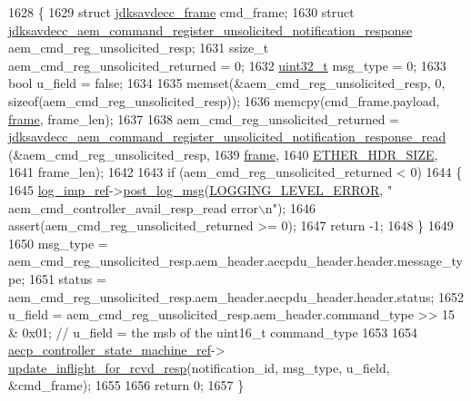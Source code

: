 \begin{DoxyCode}
1628 \{
1629     \textcolor{keyword}{struct }\hyperlink{structjdksavdecc__frame}{jdksavdecc\_frame} cmd\_frame;
1630     \textcolor{keyword}{struct }\hyperlink{structjdksavdecc__aem__command__register__unsolicited__notification__response}{jdksavdecc\_aem\_command\_register\_unsolicited\_notification\_response}
       aem\_cmd\_reg\_unsolicited\_resp;
1631     ssize\_t aem\_cmd\_reg\_unsolicited\_returned = 0;
1632     \hyperlink{parse_8c_a6eb1e68cc391dd753bc8ce896dbb8315}{uint32\_t} msg\_type = 0;
1633     \textcolor{keywordtype}{bool} u\_field = \textcolor{keyword}{false};
1634 
1635     memset(&aem\_cmd\_reg\_unsolicited\_resp, 0, \textcolor{keyword}{sizeof}(aem\_cmd\_reg\_unsolicited\_resp));
1636     memcpy(cmd\_frame.payload, \hyperlink{gst__avb__playbin_8c_ac8e710e0b5e994c0545d75d69868c6f0}{frame}, frame\_len);
1637 
1638     aem\_cmd\_reg\_unsolicited\_returned = 
      \hyperlink{group__command__register__unsolicited__notification__response_gad5b65676e63204bcbc249135a0d1d9be}{jdksavdecc\_aem\_command\_register\_unsolicited\_notification\_response\_read}
      (&aem\_cmd\_reg\_unsolicited\_resp,
1639                                                                                                            
         \hyperlink{gst__avb__playbin_8c_ac8e710e0b5e994c0545d75d69868c6f0}{frame},
1640                                                                                                            
         \hyperlink{namespaceavdecc__lib_a6c827b1a0d973e18119c5e3da518e65ca9512ad9b34302ba7048d88197e0a2dc0}{ETHER\_HDR\_SIZE},
1641                                                                                                            
         frame\_len);
1642 
1643     \textcolor{keywordflow}{if} (aem\_cmd\_reg\_unsolicited\_returned < 0)
1644     \{
1645         \hyperlink{namespaceavdecc__lib_acbe3e2a96ae6524943ca532c87a28529}{log\_imp\_ref}->\hyperlink{classavdecc__lib_1_1log_a68139a6297697e4ccebf36ccfd02e44a}{post\_log\_msg}(\hyperlink{namespaceavdecc__lib_a501055c431e6872ef46f252ad13f85cdaf2c4481208273451a6f5c7bb9770ec8a}{LOGGING\_LEVEL\_ERROR}, \textcolor{stringliteral}{"
      aem\_cmd\_controller\_avail\_resp\_read error\(\backslash\)n"});
1646         assert(aem\_cmd\_reg\_unsolicited\_returned >= 0);
1647         \textcolor{keywordflow}{return} -1;
1648     \}
1649 
1650     msg\_type = aem\_cmd\_reg\_unsolicited\_resp.aem\_header.aecpdu\_header.header.message\_type;
1651     status = aem\_cmd\_reg\_unsolicited\_resp.aem\_header.aecpdu\_header.header.status;
1652     u\_field = aem\_cmd\_reg\_unsolicited\_resp.aem\_header.command\_type >> 15 & 0x01; \textcolor{comment}{// u\_field = the msb of
       the uint16\_t command\_type}
1653 
1654     \hyperlink{namespaceavdecc__lib_a0b1b5aea3c0490f77cbfd9178af5be22}{aecp\_controller\_state\_machine\_ref}->
      \hyperlink{classavdecc__lib_1_1aecp__controller__state__machine_a997abd9786c330a5505e903e6443208e}{update\_inflight\_for\_rcvd\_resp}(notification\_id, msg\_type, u\_field, &cmd\_frame);
1655 
1656     \textcolor{keywordflow}{return} 0;
1657 \}
\end{DoxyCode}


